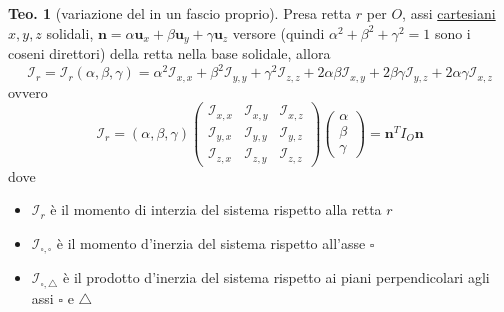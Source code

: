\documentclass[a4paper,10pt]{article}
\theoremstyle{definition}
\newcommand{\bv}{\boldsymbol} %
\theoremstyle{indentdefinition}
\theoremstyle{indenttheorem}
\newtheorem{thm}{Teo.}
\theoremstyle{myremark}
\theoremstyle{indentgeneral}
\newenvironment{myboxed} 
{\noindent\begin{lrbox}{\mybox}\begin{minipage}{\textwidth}}
{\end{minipage}\end{lrbox}\fbox{\usebox{\mybox}}}
\begin{document}
\begin{myboxed}
\begin{thm}[variazione del  in un fascio proprio] Presa retta $r$ per $O$, assi \underline{cartesiani} $x,y,z$ solidali, $\bv{n}=\alpha\bv{u}_x+\beta\bv{u}_y+\gamma\bv{u}_z$ versore (quindi $\alpha^2+\beta^2+\gamma^2=1$ sono i coseni direttori) della retta nella base solidale, allora
$$\mathcal{I}_{r}=\mathcal{I}_{r}\left(\alpha,\beta,\gamma\right)=\alpha^{2}\mathcal{I}_{x,x}+\beta^{2}\mathcal{I}_{y,y}+\gamma^{2}\mathcal{I}_{z,z}+2\alpha\beta\mathcal{I}_{x,y}+2\beta\gamma\mathcal{I}_{y,z}+2\alpha\gamma\mathcal{I}_{x,z}$$
ovvero
$$\mathcal{I}_{r}=\left(\alpha,\beta,\gamma\right)\begin{pmatrix}\mathcal{I}_{x,x} & \mathcal{I}_{x,y} & \mathcal{I}_{x,z}\\
\mathcal{I}_{y,x} & \mathcal{I}_{y,y} & \mathcal{I}_{y,z}\\
\mathcal{I}_{z,x} & \mathcal{I}_{z,y} & \mathcal{I}_{z,z}
\end{pmatrix}\begin{pmatrix}\alpha\\
\beta\\
\gamma
\end{pmatrix}=\boldsymbol{n}^T I_{O}\boldsymbol{n}$$
dove
\begin{itemize}
\item $\mathcal{I}_r$ è il momento di interzia del sistema rispetto alla retta $r$
    \item $\mathcal{I}_{\square,\square}$ è il momento d'inerzia del sistema rispetto all'asse $\square$
    \item $\mathcal{I}_{\square,\triangle}$ è il prodotto d'inerzia del sistema rispetto ai piani perpendicolari agli assi $\square$ e $\triangle$
\end{itemize}
\end{thm}
\end{myboxed}
\end{document}
